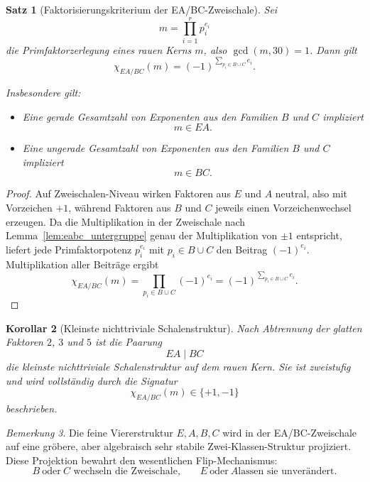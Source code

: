 \documentclass[11pt,a4paper]{article}
\newtheorem{satz}{Satz}
\newtheorem{korollar}[satz]{Korollar}
\theoremstyle{definition}
\theoremstyle{remark}
\newtheorem{bemerkung}[satz]{Bemerkung}
\begin{document}
	\begin{satz}[Faktorisierungskriterium der EA/BC-Zweischale]
		\label{satz:eabc_faktorisierung}
		Sei
		\[
		m=\prod_{i=1}^r p_i^{e_i}
		\]
		die Primfaktorzerlegung eines rauen Kerns \(m\), also \(\gcd(m,30)=1\). Dann gilt
		\[
		\boxed{
			\chi_{EA/BC}(m)
			=
			(-1)^{\sum_{p_i\in B\cup C} e_i}.
		}
		\]
		
		Insbesondere gilt:
		\begin{itemize}
			\item Eine gerade Gesamtzahl von Exponenten aus den Familien \(B\) und \(C\) impliziert
			\[
			m\in EA.
			\]
			\item Eine ungerade Gesamtzahl von Exponenten aus den Familien \(B\) und \(C\) impliziert
			\[
			m\in BC.
			\]
		\end{itemize}
	\end{satz}
	
	\begin{proof}
		Auf Zweischalen-Niveau wirken Faktoren aus \(E\) und \(A\) neutral, also mit Vorzeichen
		\(+1\), während Faktoren aus \(B\) und \(C\) jeweils einen Vorzeichenwechsel erzeugen.
		Da die Multiplikation in der Zweischale nach Lemma~\ref{lem:eabc_untergruppe} genau der
		Multiplikation von \(\pm1\) entspricht, liefert jede Primfaktorpotenz \(p_i^{e_i}\) mit
		\(p_i\in B\cup C\) den Beitrag \((-1)^{e_i}\). Multiplikation aller Beiträge ergibt
		\[
		\chi_{EA/BC}(m)
		=
		\prod_{p_i\in B\cup C} (-1)^{e_i}
		=
		(-1)^{\sum_{p_i\in B\cup C} e_i}.
		\]
	\end{proof}
	
	\begin{korollar}[Kleinste nichttriviale Schalenstruktur]
		\label{kor:eabc_kleinste_schale}
		Nach Abtrennung der glatten Faktoren \(2\), \(3\) und \(5\) ist die Paarung
		\[
		EA\mid BC
		\]
		die kleinste nichttriviale Schalenstruktur auf dem rauen Kern. Sie ist zweistufig und wird
		vollständig durch die Signatur
		\[
		\chi_{EA/BC}(m)\in\{+1,-1\}
		\]
		beschrieben.
	\end{korollar}
	
	\begin{bemerkung}
		Die feine Viererstruktur \(E,A,B,C\) wird in der EA/BC-Zweischale auf eine gröbere, aber
		algebraisch sehr stabile Zwei-Klassen-Struktur projiziert. Diese Projektion bewahrt den
		wesentlichen Flip-Mechanismus:
		\[
		B\ \text{oder}\ C \text{ wechseln die Zweischale,}
		\qquad
		E\ \text{oder}\ A \text{lassen sie unverändert.}
		\]
	\end{bemerkung}
	
\end{document}
